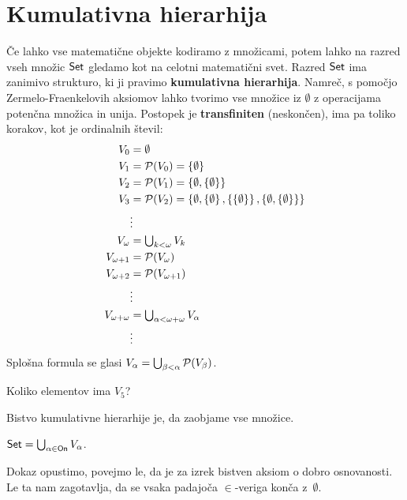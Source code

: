 \section{Kumulativna hierarhija}

Če lahko vse matematične objekte kodiramo z množicami, potem lahko na razred
vseh množic $\mathsf{Set}$ gledamo kot na celotni matematični svet. Razred $\mathsf{Set}$ ima
zanimivo strukturo, ki ji pravimo \textbf{kumulativna hierarhija}. Namreč, s pomočjo
Zermelo-Fraenkelovih aksiomov lahko tvorimo vse množice iz $\emptyset$ z
operacijama potenčna množica in unija. Postopek je \textbf{transfiniten} (neskončen), ima pa toliko korakov, kot je ordinalnih števil:
%
\begin{align*}
  V_0 &= \emptyset \\
  V_1 &= \mathcal{P}(V_0) = \left\{\emptyset\right\} \\
  V_2 &= \mathcal{P}(V_1) = \left\{\emptyset, \left\{\emptyset\right\}\right\} \\
  V_3 &= \mathcal{P}(V_2) = \left\{\emptyset, \left\{\emptyset\right\}, \left\{\left\{\emptyset\right\}\right\}, \left\{\emptyset, \left\{\emptyset\right\}\right\}\right\} \\
      &\vdots \\
  V_\omega &= \textstyle\bigcup_{k < \omega} V_k \\
  V_{\omega+1} &= \mathcal{P}(V_\omega) \\
  V_{\omega+2} &= \mathcal{P}(V_{\omega+1}) \\
  &\vdots \\
  V_{\omega + \omega} &= \textstyle\bigcup_{\alpha < \omega + \omega} V_\alpha \\
  &\vdots
\end{align*}
%
Splošna formula se glasi $V_\alpha = \textstyle\bigcup_{\beta < \alpha} \mathcal{P}(V_\beta)$.


\begin{naloga}
  Koliko elementov ima $V_5$?
\end{naloga}

Bistvo kumulativne hierarhije je, da zaobjame vse množice.

\begin{izrek}
  $\mathsf{Set} = \bigcup_{\alpha \in \mathsf{On}} V_\alpha$.
\end{izrek}

\begin{dokaz}
  Dokaz opustimo, povejmo le, da je za izrek bistven aksiom o dobro osnovanosti. Le ta nam zagotavlja, da se vsaka padajoča $\in$-veriga konča z~$\emptyset$.
\end{dokaz}


